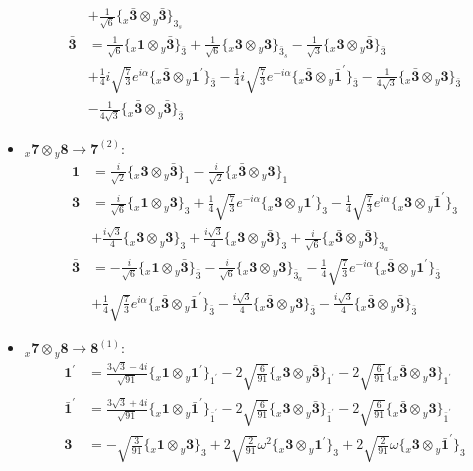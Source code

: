 \documentclass[english]{article}
\newcommand{\rep}[1]{\mathbf{#1}}
\newcommand{\repx}[2]{{}_{#2}\mathbf{#1}}
\newcommand{\subcg}[3]{\big\{ \repx{#1}{x}\otimes\repx{#2}{y}\big\}^{}_{#3}}
\begin{document}
\begin{itemize}
\begin{align*}
 & +\frac{1}{\sqrt{6}}\subcg{\bar{3}}{\bar{3}}{3_{s}}
\\
\rep{\bar{3}} & = \frac{1}{\sqrt{6}}\subcg{1}{\bar{3}}{\bar{3}}+\frac{1}{\sqrt{6}}\subcg{3}{3}{\bar{3}_{s}}-\frac{1}{\sqrt{3}}\subcg{3}{\bar{3}}{\bar{3}} \\ 
 & +\frac{1}{4} i \sqrt{\frac{7}{3}} e^{i \alpha }\subcg{\bar{3}}{1^{\prime}}{\bar{3}}-\frac{1}{4} i \sqrt{\frac{7}{3}} e^{-i \alpha }\subcg{\bar{3}}{\bar{1}^{\prime}}{\bar{3}}-\frac{1}{4 \sqrt{3}}\subcg{\bar{3}}{3}{\bar{3}} \\ 
 & -\frac{1}{4 \sqrt{3}}\subcg{\bar{3}}{\bar{3}}{\bar{3}}
\end{align*}
\item $\repx{7}{x}\otimes\repx{8}{y}\to\rep{7}^{(2)}$:
\begin{align*}
\rep{1} & = \frac{i}{\sqrt{2}}\subcg{3}{\bar{3}}{1}-\frac{i}{\sqrt{2}}\subcg{\bar{3}}{3}{1}
\\
\rep{3} & = \frac{i}{\sqrt{6}}\subcg{1}{3}{3}+\frac{1}{4} \sqrt{\frac{7}{3}} e^{-i \alpha }\subcg{3}{1^{\prime}}{3}-\frac{1}{4} \sqrt{\frac{7}{3}} e^{i \alpha }\subcg{3}{\bar{1}^{\prime}}{3} \\ 
 & +\frac{i \sqrt{3}}{4}\subcg{3}{3}{3}+\frac{i \sqrt{3}}{4}\subcg{3}{\bar{3}}{3}+\frac{i}{\sqrt{6}}\subcg{\bar{3}}{\bar{3}}{3_{a}}
\\
\rep{\bar{3}} & = -\frac{i}{\sqrt{6}}\subcg{1}{\bar{3}}{\bar{3}}-\frac{i}{\sqrt{6}}\subcg{3}{3}{\bar{3}_{a}}-\frac{1}{4} \sqrt{\frac{7}{3}} e^{-i \alpha }\subcg{\bar{3}}{1^{\prime}}{\bar{3}} \\ 
 & +\frac{1}{4} \sqrt{\frac{7}{3}} e^{i \alpha }\subcg{\bar{3}}{\bar{1}^{\prime}}{\bar{3}}-\frac{i \sqrt{3}}{4}\subcg{\bar{3}}{3}{\bar{3}}-\frac{i \sqrt{3}}{4}\subcg{\bar{3}}{\bar{3}}{\bar{3}}
\end{align*}
\item $\repx{7}{x}\otimes\repx{8}{y}\to\rep{8}^{(1)}$:
\begin{align*}
\rep{1^{\prime}} & = \frac{3 \sqrt{3}-4 i}{\sqrt{91}}\subcg{1}{1^{\prime}}{1^{\prime}}-2 \sqrt{\frac{6}{91}}\subcg{3}{\bar{3}}{1^{\prime}}-2 \sqrt{\frac{6}{91}}\subcg{\bar{3}}{3}{1^{\prime}}
\\
\rep{\bar{1}^{\prime}} & = \frac{3 \sqrt{3}+4 i}{\sqrt{91}}\subcg{1}{\bar{1}^{\prime}}{\bar{1}^{\prime}}-2 \sqrt{\frac{6}{91}}\subcg{3}{\bar{3}}{\bar{1}^{\prime}}-2 \sqrt{\frac{6}{91}}\subcg{\bar{3}}{3}{\bar{1}^{\prime}}
\\
\rep{3} & = -\sqrt{\frac{3}{91}}\subcg{1}{3}{3}+2 \sqrt{\frac{2}{91}} \omega ^2\subcg{3}{1^{\prime}}{3}+2 \sqrt{\frac{2}{91}} \omega\subcg{3}{\bar{1}^{\prime}}{3} \\ 

\end{align*}
\end{itemize}
\end{document}
